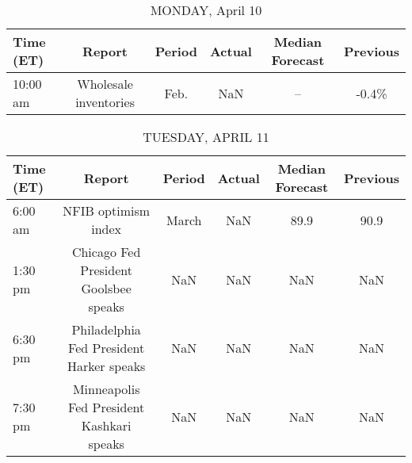 \documentclass{article}%
\begin{document}
%
\normalsize%


\begin{table}[htbp]%
\caption{MONDAY, April 10}%
\centering%
\begin{adjustbox}{width=1\textwidth}%
\begin{tabular}{lccccc}
\toprule
Time (ET) &                Report & Period & Actual & Median Forecast & Previous \\
\midrule
 10:00 am & Wholesale inventories &   Feb. &    NaN &              -- &    -0.4\% \\
\bottomrule
\end{tabular}
%
\end{adjustbox}%
\end{table}

%


\begin{table}[htbp]%
\caption{TUESDAY, APRIL 11}%
\centering%
\begin{adjustbox}{width=1\textwidth}%
\begin{tabular}{lccccc}
\toprule
Time (ET) &                                    Report & Period & Actual & Median Forecast & Previous \\
\midrule
  6:00 am &                       NFIB optimism index &  March &    NaN &            89.9 &     90.9 \\
  1:30 pm &     Chicago Fed President Goolsbee speaks &    NaN &    NaN &             NaN &      NaN \\
  6:30 pm &  Philadelphia Fed President Harker speaks &    NaN &    NaN &             NaN &      NaN \\
  7:30 pm & Minneapolis Fed President Kashkari speaks &    NaN &    NaN &             NaN &      NaN \\
\bottomrule
\end{tabular}
%
\end{adjustbox}%
\end{table}

%
\end{document}
